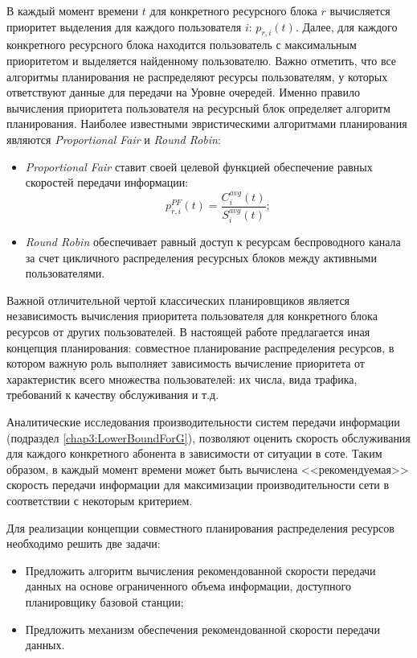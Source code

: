 В каждый момент времени $t$ для конкретного ресурсного блока $r$ вычисляется приоритет выделения для каждого пользователя $i$: $p_{r,i}(t)$. Далее, для каждого конкретного ресурсного блока находится пользователь с максимальным приоритетом и выделяется найденному пользователю. Важно отметить, что все алгоритмы планирования не распределяют ресурсы пользователям, у которых ответствуют данные для передачи на Уровне очередей. Именно правило вычисления приоритета пользователя на ресурсный блок определяет алгоритм планирования. Наиболее известными эвристическими алгоритмами планирования являются \textit{Proportional Fair} и \textit{Round Robin}:
\begin{itemize}
	\item \textit{Proportional Fair} ставит своей целевой функцией обеспечение равных скоростей передачи информации:
	$$p^{PF}_{r,i}(t) = \frac{C_i^{avg}(t)}{S_i^{avg}(t)};$$
	\item \textit{Round Robin} обеспечивает равный доступ к ресурсам беспроводного канала за счет цикличного распределения ресурсных блоков между активными пользователями.
\end{itemize}

Важной отличительной чертой классических планировщиков является независимость вычисления приоритета пользователя для конкретного блока ресурсов от других пользователей. В настоящей работе предлагается иная концепция планирования: совместное планирование распределения ресурсов, в котором важную роль выполняет зависимость вычисление приоритета от характеристик всего множества пользователей: их числа, вида трафика, требований к качеству обслуживания и т.д.

Аналитические исследования производительности систем передачи информации (подраздел \ref{chap3:LowerBoundForG}), позволяют оценить скорость обслуживания для каждого конкретного абонента в зависимости от ситуации в соте. Таким образом, в каждый момент времени может быть вычислена <<рекомендуемая>> скорость передачи информации для максимизации производительности сети в соответствии с некоторым критерием.

Для реализации концепции совместного планирования распределения ресурсов необходимо решить две задачи:
\begin{itemize}
	\item Предложить алгоритм вычисления рекомендованной скорости передачи данных на основе ограниченного объема информации, доступного планировщику базовой станции;
	\item Предложить механизм обеспечения рекомендованной скорости передачи данных.
\end{itemize}

